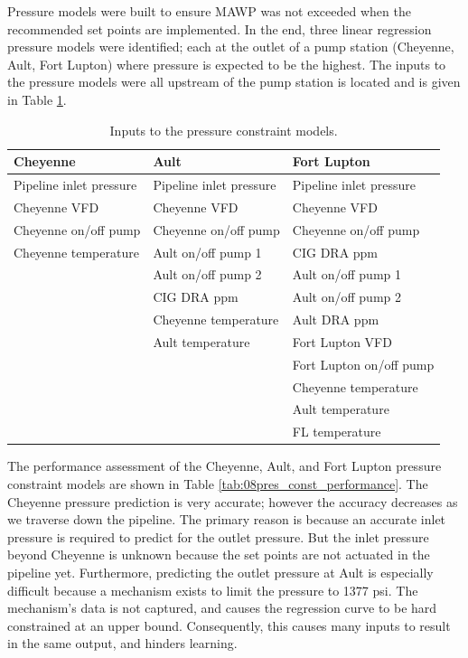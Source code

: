 Pressure models were built to ensure MAWP was not exceeded when the recommended set points are implemented. In the end, three linear regression pressure models were identified; each at the outlet of a pump station (Cheyenne, Ault, Fort Lupton) where pressure is expected to be the highest. The inputs to the pressure models were all upstream of the pump station is located and is given in Table \ref{tab:08pressure_inputs}.

\begin{table}[]
    \centering
    {
    \begin{tabular}{p{5cm} | p{5cm} | p{5cm}}
         Cheyenne & Ault & Fort Lupton \\
         \hline
         
         Pipeline inlet pressure & Pipeline inlet pressure & Pipeline inlet pressure \\
         
         Cheyenne VFD & Cheyenne VFD & Cheyenne VFD \\
         
         Cheyenne on/off pump & Cheyenne on/off pump & Cheyenne on/off pump \\
         
         Cheyenne temperature & Ault on/off pump 1 & CIG DRA ppm \\
         
         & Ault on/off pump 2 & Ault on/off pump 1 \\
         
         & CIG DRA ppm & Ault on/off pump 2 \\
         
         & Cheyenne temperature & Ault DRA ppm \\
         
         & Ault temperature & Fort Lupton VFD \\
         & & Fort Lupton on/off pump \\
         & & Cheyenne temperature \\
         & & Ault temperature \\
         & & FL temperature \\
    \end{tabular}}
    \caption{Inputs to the pressure constraint models.}
    \label{tab:08pressure_inputs}
\end{table}

The performance assessment of the Cheyenne, Ault, and Fort Lupton pressure constraint models are shown in Table \ref{tab:08pres_const_performance}. The Cheyenne pressure prediction is very accurate; however the accuracy decreases as we traverse down the pipeline.  The primary reason is because an accurate inlet pressure is required to predict for the outlet pressure.  But the inlet pressure beyond Cheyenne is unknown because the set points are not actuated in the pipeline yet. Furthermore, predicting the outlet pressure at Ault is especially difficult because a mechanism exists to limit the pressure to 1377 psi.  The mechanism's data is not captured, and causes the regression curve to be hard constrained at an upper bound. Consequently, this causes many inputs to result in the same output, and hinders learning.

